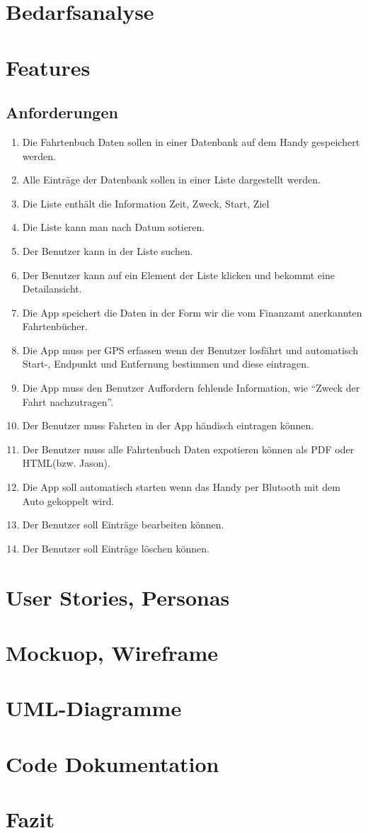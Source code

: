 \documentclass[a4paper]{article}
\begin{document}
\section{Bedarfsanalyse}

\section{Features}
\subsection{Anforderungen}
\begin{enumerate}
	\item Die Fahrtenbuch Daten sollen in einer Datenbank auf dem Handy gespeichert werden.
	\item Alle Einträge der Datenbank sollen in einer Liste dargestellt werden.
	\item Die Liste enthält die Information Zeit, Zweck, Start, Ziel
	\item Die Liste kann man nach Datum sotieren.
	\item Der Benutzer kann in der Liste suchen.
	\item Der Benutzer kann auf ein Element der Liste klicken und bekommt eine Detailansicht.
	\item Die App speichert die Daten in der Form wir die vom Finanzamt anerkannten Fahrtenbücher.
	\item Die App muss per GPS erfassen wenn der Benutzer losfährt und automatisch Start-, Endpunkt und Entfernung bestimmen und diese eintragen.
	\item Die App muss den Benutzer Auffordern fehlende Information, wie \enquote{Zweck der Fahrt nachzutragen}.
	\item Der Benutzer muss Fahrten in der App händisch eintragen können.
	\item Der Benutzer muss alle Fahrtenbuch Daten expotieren können als PDF oder HTML(bzw. Jason).
	\item Die App soll automatisch starten wenn das Handy per Blutooth mit dem Auto gekoppelt wird.
	\item Der Benutzer soll Einträge bearbeiten können.
	\item Der Benutzer soll Einträge löschen können.
\end{enumerate}

\section{User Stories, Personas}

\section{Mockuop, Wireframe}

\section{UML-Diagramme}

\section{Code Dokumentation}

\section{Fazit}
\end{document}
